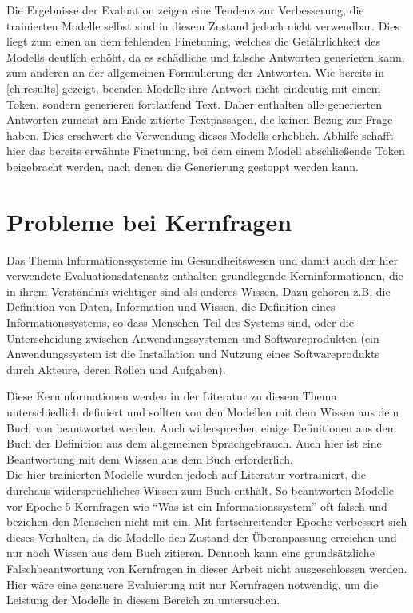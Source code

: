 Die Ergebnisse der Evaluation zeigen eine Tendenz zur Verbesserung, die trainierten Modelle selbst sind in diesem Zustand jedoch nicht verwendbar.
Dies liegt zum einen an dem fehlenden Finetuning, welches die Gefährlichkeit des Modells deutlich erhöht, da es schädliche und falsche Antworten generieren kann, zum anderen an der allgemeinen Formulierung der Antworten.
Wie bereits in \cref{ch:results} gezeigt, beenden Modelle ihre Antwort nicht eindeutig mit einem Token, sondern generieren fortlaufend Text.
Daher enthalten alle generierten Antworten zumeist am Ende zitierte Textpassagen, die keinen Bezug zur Frage haben.
Dies erschwert die Verwendung dieses Modells erheblich.
Abhilfe schafft hier das bereits erwähnte Finetuning, bei dem einem Modell abschließende Token beigebracht werden, nach denen die Generierung gestoppt werden kann.

\section{Probleme bei Kernfragen}
Das Thema Informationssysteme im Gesundheitswesen und damit auch der hier verwendete Evaluationsdatensatz enthalten grundlegende Kerninformationen,
die in ihrem Verständnis wichtiger sind als anderes Wissen. Dazu gehören z.B. die Definition von Daten, Information und Wissen, die Definition eines Informationssystems, so dass Menschen Teil des Systems sind, oder die Unterscheidung zwischen Anwendungssystemen und Softwareprodukten (ein Anwendungssystem ist die Installation und Nutzung eines Softwareprodukts durch Akteure, deren Rollen und Aufgaben).

Diese Kerninformationen werden in der Literatur zu diesem Thema unterschiedlich definiert und sollten von den Modellen mit dem Wissen aus dem Buch von \citet{bb} beantwortet werden.
Auch widersprechen einige Definitionen aus dem Buch der Definition aus dem allgemeinen Sprachgebrauch. Auch hier ist eine Beantwortung mit dem Wissen aus dem Buch erforderlich.\\

Die hier trainierten Modelle wurden jedoch auf Literatur vortrainiert, die durchaus widersprüchliches Wissen zum Buch enthält.
So beantworten Modelle vor Epoche 5 Kernfragen wie \enquote{Was ist ein Informationssystem} oft falsch und beziehen den Menschen nicht mit ein.
Mit fortschreitender Epoche verbessert sich dieses Verhalten, da die Modelle den Zustand der Überanpassung erreichen und nur noch Wissen aus dem Buch zitieren.
Dennoch kann eine grundsätzliche Falschbeantwortung von Kernfragen in dieser Arbeit nicht ausgeschlossen werden.
Hier wäre eine genauere Evaluierung mit nur Kernfragen notwendig, um die Leistung der Modelle in diesem Bereich zu untersuchen.\\


